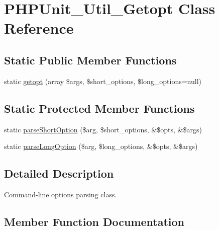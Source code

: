 \hypertarget{class_p_h_p_unit___util___getopt}{}\section{P\+H\+P\+Unit\+\_\+\+Util\+\_\+\+Getopt Class Reference}
\label{class_p_h_p_unit___util___getopt}
\subsection*{Static Public Member Functions}
\begin{DoxyCompactItemize}
\item 
static \mbox{\hyperlink{class_p_h_p_unit___util___getopt_a7fac676682bc8b09a1541fa6da6ea169}{getopt}} (array \$args, \$short\+\_\+options, \$long\+\_\+options=null)
\end{DoxyCompactItemize}
\subsection*{Static Protected Member Functions}
\begin{DoxyCompactItemize}
\item 
static \mbox{\hyperlink{class_p_h_p_unit___util___getopt_aabde98228d79c9c58761b4730c4b91db}{parse\+Short\+Option}} (\$arg, \$short\+\_\+options, \&\$opts, \&\$args)
\item 
static \mbox{\hyperlink{class_p_h_p_unit___util___getopt_ac4e6c83d1de77c181af5aab31fe548e1}{parse\+Long\+Option}} (\$arg, \$long\+\_\+options, \&\$opts, \&\$args)
\end{DoxyCompactItemize}


\subsection{Detailed Description}
Command-\/line options parsing class. 

\subsection{Member Function Documentation}
\mbox{\label{class_p_h_p_unit___util___getopt_a7fac676682bc8b09a1541fa6da6ea169}} 
